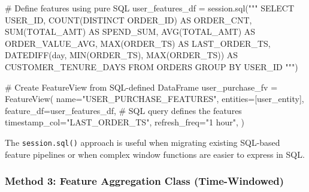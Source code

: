 \documentclass[
  letterpaper,
  DIV=11,
  numbers=noendperiod]{scrreprt}
\newenvironment{Shaded}{\begin{snugshade}}{\end{snugshade}}
\newcommand{\CommentTok}[1]{\textcolor[rgb]{0.37,0.37,0.37}{#1}}
\newcommand{\NormalTok}[1]{\textcolor[rgb]{0.00,0.23,0.31}{#1}}
\newcommand{\OperatorTok}[1]{\textcolor[rgb]{0.37,0.37,0.37}{#1}}
\newcommand{\StringTok}[1]{\textcolor[rgb]{0.13,0.47,0.30}{#1}}
\begin{document}
\begin{Shaded}
\begin{Highlighting}[]
\CommentTok{\# Define features using pure SQL}
\NormalTok{user\_features\_df }\OperatorTok{=}\NormalTok{ session.sql(}\StringTok{"""}
\StringTok{    SELECT }
\StringTok{        USER\_ID,}
\StringTok{        COUNT(DISTINCT ORDER\_ID) AS ORDER\_CNT,}
\StringTok{        SUM(TOTAL\_AMT) AS SPEND\_SUM,}
\StringTok{        AVG(TOTAL\_AMT) AS ORDER\_VALUE\_AVG,}
\StringTok{        MAX(ORDER\_TS) AS LAST\_ORDER\_TS,}
\StringTok{        DATEDIFF(\textquotesingle{}day\textquotesingle{}, MIN(ORDER\_TS), MAX(ORDER\_TS)) AS CUSTOMER\_TENURE\_DAYS}
\StringTok{    FROM ORDERS}
\StringTok{    GROUP BY USER\_ID}
\StringTok{"""}\NormalTok{)}

\CommentTok{\# Create FeatureView from SQL{-}defined DataFrame}
\NormalTok{user\_purchase\_fv }\OperatorTok{=}\NormalTok{ FeatureView(}
\NormalTok{    name}\OperatorTok{=}\StringTok{"USER\_PURCHASE\_FEATURES"}\NormalTok{,}
\NormalTok{    entities}\OperatorTok{=}\NormalTok{[user\_entity],}
\NormalTok{    feature\_df}\OperatorTok{=}\NormalTok{user\_features\_df,  }\CommentTok{\# SQL query defines the features}
\NormalTok{    timestamp\_col}\OperatorTok{=}\StringTok{"LAST\_ORDER\_TS"}\NormalTok{,}
\NormalTok{    refresh\_freq}\OperatorTok{=}\StringTok{"1 hour"}\NormalTok{,}
\NormalTok{)}
\end{Highlighting}
\end{Shaded}

\begin{tcolorbox}[enhanced jigsaw, title=\textcolor{quarto-callout-tip-color}{\faLightbulb}\hspace{0.5em}{When to Use SQL}, colbacktitle=quarto-callout-tip-color!10!white, rightrule=.15mm, arc=.35mm, colframe=quarto-callout-tip-color-frame, left=2mm, bottomtitle=1mm, toptitle=1mm, breakable, bottomrule=.15mm, opacityback=0, titlerule=0mm, toprule=.15mm, opacitybacktitle=0.6, colback=white, coltitle=black, leftrule=.75mm]

The \texttt{session.sql()} approach is useful when migrating existing
SQL-based feature pipelines or when complex window functions are easier
to express in SQL.

\end{tcolorbox}

\hypertarget{sec-aggregations-api}{%
\subsubsection{Method 3: Feature Aggregation Class
(Time-Windowed)}\label{sec-aggregations-api}}
\end{document}
